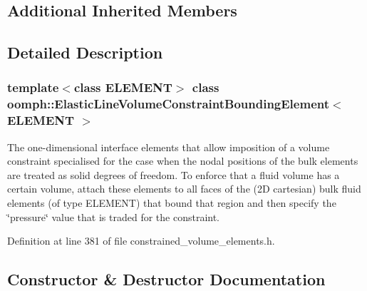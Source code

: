\subsection*{Additional Inherited Members}


\subsection{Detailed Description}
\subsubsection*{template$<$class E\+L\+E\+M\+E\+NT$>$\newline
class oomph\+::\+Elastic\+Line\+Volume\+Constraint\+Bounding\+Element$<$ E\+L\+E\+M\+E\+N\+T $>$}

The one-\/dimensional interface elements that allow imposition of a volume constraint specialised for the case when the nodal positions of the bulk elements are treated as solid degrees of freedom. To enforce that a fluid volume has a certain volume, attach these elements to all faces of the (2D cartesian) bulk fluid elements (of type E\+L\+E\+M\+E\+NT) that bound that region and then specify the \char`\"{}pressure\char`\"{} value that is traded for the constraint. 

Definition at line 381 of file constrained\+\_\+volume\+\_\+elements.\+h.



\subsection{Constructor \& Destructor Documentation}
\mbox{\label{classoomph_1_1ElasticLineVolumeConstraintBoundingElement_a4759433aaab9f854126480581e4f08d5}} 
